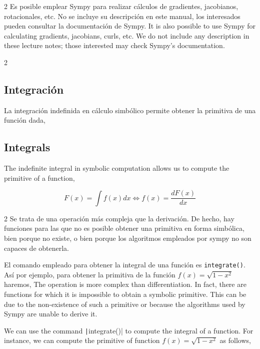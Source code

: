 \begin{paracol}{2}
Es posible emplear Sympy para realizar cálculos de gradientes, jacobianos, rotacionales, etc. No se incluye su descripción en este manual, los interesados pueden consultar la documentación de Sympy.
\switchcolumn
It is also possible to use Sympy for calculating gradients, jacobians, curls, etc. We do not include any description in these lecture notes; those interested may check Sympy's documentation.
\end{paracol}

\begin{paracol}{2}
\subsection{Integración} 
La integración indefinida en cálculo simbólico permite obtener la primitiva de una función dada,
\switchcolumn
\subsection{Integrals}
The indefinite integral in symbolic computation allows us to compute the primitive of a function,
\end{paracol}
\begin{equation*}
F(x) = \int f(x)dx  \Leftrightarrow f(x) = \frac{dF(x)}{dx}  
\end{equation*}
\begin{paracol}{2}
Se trata de una operación más compleja que la derivación. De hecho, hay funciones para las que no es posible obtener una primitiva en forma simbólica, bien porque no existe, o bien porque los algoritmos empleados por sympy no son capaces de obtenerla.

El comando empleado para obtener la integral de una función es \texttt{integrate()}. Así por ejemplo, para obtener la primitiva de la función $f(x) = \sqrt{1-x^2}$ haremos,
\switchcolumn
The operation is more complex than differentiation. In fact, there are functions for which it is impossible to obtain a symbolic primitive. This can be due to the non-existence of such a primitive or because the algorithms used by Sympy are unable to derive it.

We can use the command \texttt|integrate()| to compute the integral of a function. For instance, we can compute the primitive of function $f(x) = \sqrt{1-x^2}$ as follows,

\end{paracol}
